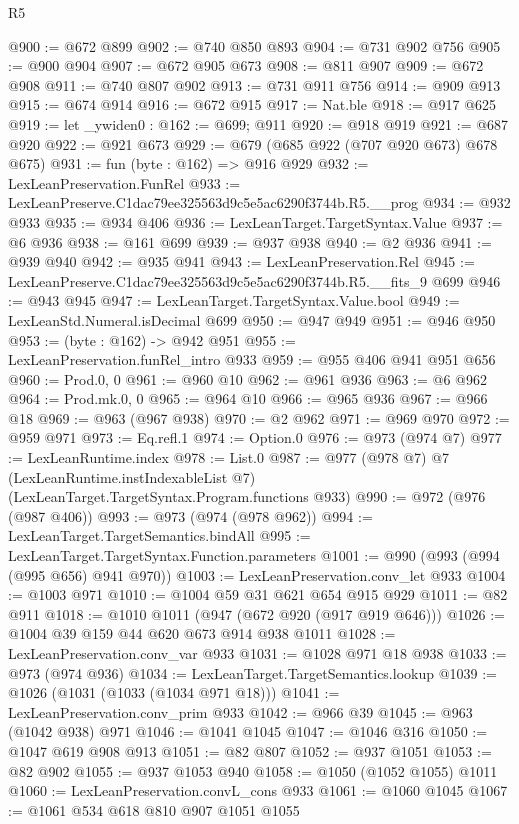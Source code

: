 \begin{lexlean}{R5}
\begin{coremodule}
@900 := @672 @899
@902 := @740 @850 @893
@904 := @731 @902 @756
@905 := @900 @904
@907 := @672 @905 @673
@908 := @811 @907
@909 := @672 @908
@911 := @740 @807 @902
@913 := @731 @911 @756
@914 := @909 @913
@915 := @674 @914
@916 := @672 @915
@917 := Nat.ble
@918 := @917 @625
@919 := let _ywiden0 : @162 := @699; @911
@920 := @918 @919
@921 := @687 @920
@922 := @921 @673
@929 := @679 (@685 @922 (@707 @920 @673) @678 @675)
@931 := fun (byte : @162) => @916 @929
@932 := LexLeanPreservation.FunRel
@933 := LexLeanPreserve.C1dac79ee325563d9c5e5ac6290f3744b.R5.__prog
@934 := @932 @933
@935 := @934 @406
@936 := LexLeanTarget.TargetSyntax.Value
@937 := @6 @936
@938 := @161 @699
@939 := @937 @938
@940 := @2 @936
@941 := @939 @940
@942 := @935 @941
@943 := LexLeanPreservation.Rel
@945 := LexLeanPreserve.C1dac79ee325563d9c5e5ac6290f3744b.R5.__fits_9 @699
@946 := @943 @945
@947 := LexLeanTarget.TargetSyntax.Value.bool
@949 := LexLeanStd.Numeral.isDecimal @699
@950 := @947 @949
@951 := @946 @950
@953 := (byte : @162) -> @942 @951
@955 := LexLeanPreservation.funRel_intro @933
@959 := @955 @406 @941 @951 @656
@960 := Prod.{0, 0}
@961 := @960 @10
@962 := @961 @936
@963 := @6 @962
@964 := Prod.mk.{0, 0}
@965 := @964 @10
@966 := @965 @936
@967 := @966 @18
@969 := @963 (@967 @938)
@970 := @2 @962
@971 := @969 @970
@972 := @959 @971
@973 := Eq.refl.{1}
@974 := Option.{0}
@976 := @973 (@974 @7)
@977 := LexLeanRuntime.index
@978 := List.{0}
@987 := @977
    (@978 @7)
    @7
    (LexLeanRuntime.instIndexableList @7)
    (LexLeanTarget.TargetSyntax.Program.functions @933)
@990 := @972 (@976 (@987 @406))
@993 := @973 (@974 (@978 @962))
@994 := LexLeanTarget.TargetSemantics.bindAll
@995 := LexLeanTarget.TargetSyntax.Function.parameters
@1001 := @990 (@993 (@994 (@995 @656) @941 @970))
@1003 := LexLeanPreservation.conv_let @933
@1004 := @1003 @971
@1010 := @1004 @59 @31 @621 @654 @915 @929
@1011 := @82 @911
@1018 := @1010 @1011 (@947 (@672 @920 (@917 @919 @646)))
@1026 := @1004 @39 @159 @44 @620 @673 @914 @938 @1011
@1028 := LexLeanPreservation.conv_var @933
@1031 := @1028 @971 @18 @938
@1033 := @973 (@974 @936)
@1034 := LexLeanTarget.TargetSemantics.lookup
@1039 := @1026 (@1031 (@1033 (@1034 @971 @18)))
@1041 := LexLeanPreservation.conv_prim @933
@1042 := @966 @39
@1045 := @963 (@1042 @938) @971
@1046 := @1041 @1045
@1047 := @1046 @316
@1050 := @1047 @619 @908 @913
@1051 := @82 @807
@1052 := @937 @1051
@1053 := @82 @902
@1055 := @937 @1053 @940
@1058 := @1050 (@1052 @1055) @1011
@1060 := LexLeanPreservation.convL_cons @933
@1061 := @1060 @1045
@1067 := @1061 @534 @618 @810 @907 @1051 @1055

\end{coremodule}
\end{lexlean}
